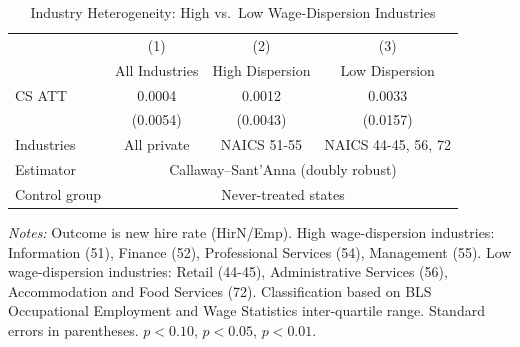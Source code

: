 \begin{table}[H]
\centering
\caption{Industry Heterogeneity: High vs.\ Low Wage-Dispersion Industries}
\label{tab:heterogeneity}
\begin{threeparttable}
\begin{tabular}{lccc}
\toprule
 & (1) & (2) & (3) \\
 & All Industries & High Dispersion & Low Dispersion \\
\midrule
CS ATT & 0.0004 & 0.0012 & 0.0033 \\
 & (0.0054) & (0.0043) & (0.0157) \\
\midrule
Industries & All private & NAICS 51-55 & NAICS 44-45, 56, 72 \\
Estimator & \multicolumn{3}{c}{Callaway--Sant'Anna (doubly robust)} \\
Control group & \multicolumn{3}{c}{Never-treated states} \\
\bottomrule
\end{tabular}
\begin{tablenotes}[flushleft]
\small
\item \textit{Notes:} Outcome is new hire rate (HirN/Emp). High wage-dispersion industries: Information (51), Finance (52), Professional Services (54), Management (55). Low wage-dispersion industries: Retail (44-45), Administrative Services (56), Accommodation and Food Services (72). Classification based on BLS Occupational Employment and Wage Statistics inter-quartile range. Standard errors in parentheses. \sym{*} \(p<0.10\), \sym{**} \(p<0.05\), \sym{***} \(p<0.01\).
\end{tablenotes}
\end{threeparttable}
\end{table}
